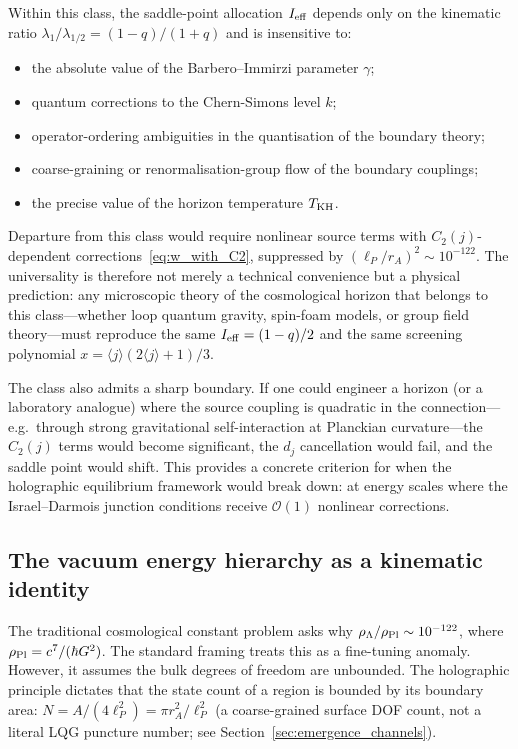 \documentclass[aps,prd,twocolumn,10pt,superscriptaddress,nofootinbib]{revtex4-2}
\begin{document}
Within this class, the saddle-point allocation $I_{\rm eff}$
depends only on the kinematic ratio
$\lambda_1/\lambda_{1/2} = (1-q)/(1+q)$ and is insensitive to:
\begin{itemize}
\item the absolute value of the Barbero--Immirzi parameter
  $\gamma$;
\item quantum corrections to the Chern-Simons level $k$;
\item operator-ordering ambiguities in the quantisation of the
  boundary theory;
\item coarse-graining or renormalisation-group flow of the
  boundary couplings;
\item the precise value of the horizon temperature $T_{\rm KH}$.
\end{itemize}
Departure from this class would require nonlinear source terms
with $C_2(j)$-dependent corrections~\eqref{eq:w_with_C2},
suppressed by $(\ell_P/r_A)^2 \sim 10^{-122}$.  The universality
is therefore not merely a technical convenience but a physical
prediction: any microscopic theory of the cosmological horizon
that belongs to this class---whether loop quantum gravity,
spin-foam models, or group field theory---must reproduce the same
$I_{\rm eff} = (1-q)/2$ and the same screening polynomial
$x = \langle j \rangle(2\langle j \rangle + 1)/3$.

The class also admits a sharp boundary.  If one could engineer a
horizon (or a laboratory analogue) where the source coupling is
quadratic in the connection---e.g.\ through strong gravitational
self-interaction at Planckian curvature---the $C_2(j)$ terms would
become significant, the $d_j$ cancellation would fail, and the
saddle point would shift.  This provides a concrete criterion for
when the holographic equilibrium framework would break down: at
energy scales where the Israel--Darmois junction conditions receive
$\mathcal{O}(1)$ nonlinear corrections.


\subsection{The vacuum energy hierarchy as a kinematic identity}
\label{sec:cc_problem}

The traditional cosmological constant problem asks why
$\rho_\Lambda/\rho_{\rm Pl} \sim 10^{-122}$, where
$\rho_{\rm Pl} = c^7/(\hbar G^2)$.  The standard framing treats
this as a fine-tuning anomaly.  However, it assumes the bulk
degrees of freedom are unbounded.  The holographic principle
dictates that the state count of a region is bounded by its
boundary area: $N = A/(4\ell_P^2) = \pi r_A^2/\ell_P^2$
(a coarse-grained surface DOF count, not a literal LQG
puncture number; see Section~\ref{sec:emergence_channels}).
\end{document}
